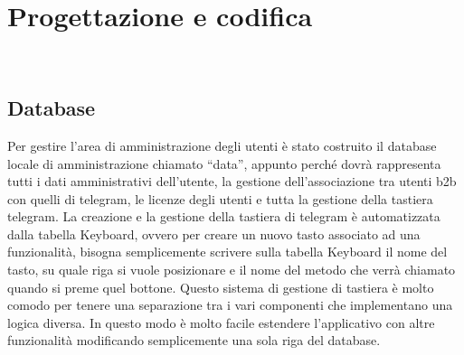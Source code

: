 
\chapter{Progettazione e codifica}
\label{cap:progettazione-codifica}

\\





\section{Database}
\label{sec:database}

Per gestire l’area di amministrazione degli utenti è stato costruito il database locale di amministrazione chiamato “data”, appunto perché dovrà rappresenta tutti i dati amministrativi dell’utente, la gestione dell’associazione tra utenti b2b con quelli di telegram, le licenze degli utenti e tutta la gestione della tastiera telegram. La creazione e la  gestione della tastiera di telegram è automatizzata dalla tabella Keyboard, ovvero per creare un nuovo tasto associato ad una funzionalità, bisogna semplicemente scrivere sulla tabella Keyboard il nome del tasto, su quale riga si vuole posizionare e il nome del metodo che verrà chiamato quando si preme quel bottone. Questo sistema di gestione di tastiera è molto comodo per tenere una separazione tra i vari componenti che implementano una logica diversa. In questo modo è molto facile estendere l’applicativo con altre funzionalità modificando semplicemente una sola riga del database. 


